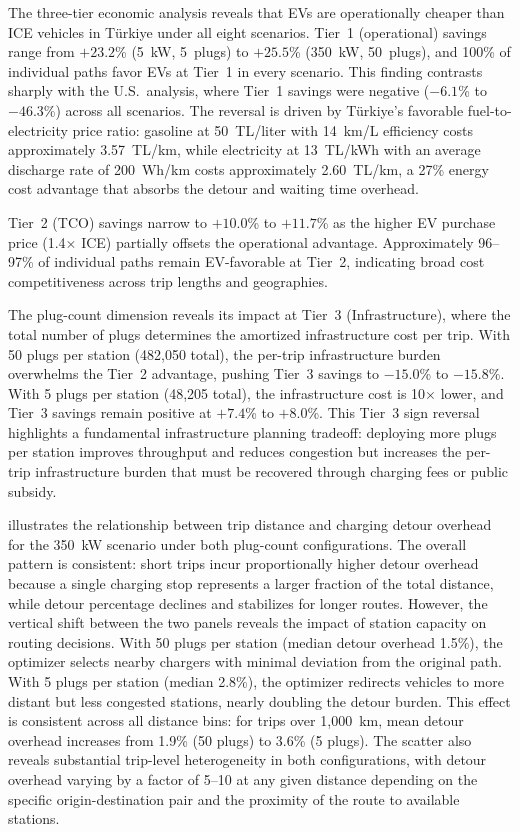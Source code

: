 The three-tier economic analysis reveals that EVs are operationally cheaper than ICE vehicles in T\"{u}rkiye under all eight scenarios. Tier~1 (operational) savings range from $+23.2$\% (5~kW, 5~plugs) to $+25.5$\% (350~kW, 50~plugs), and 100\% of individual paths favor EVs at Tier~1 in every scenario. This finding contrasts sharply with the U.S.\ analysis, where Tier~1 savings were negative ($-6.1$\% to $-46.3$\%) across all scenarios. The reversal is driven by T\"{u}rkiye's favorable fuel-to-electricity price ratio: gasoline at 50~TL/liter with 14~km/L efficiency costs approximately 3.57~TL/km, while electricity at 13~TL/kWh with an average discharge rate of 200~Wh/km costs approximately 2.60~TL/km, a 27\% energy cost advantage that absorbs the detour and waiting time overhead.

Tier~2 (TCO) savings narrow to $+10.0$\% to $+11.7$\% as the higher EV purchase price (1.4$\times$ ICE) partially offsets the operational advantage. Approximately 96--97\% of individual paths remain EV-favorable at Tier~2, indicating broad cost competitiveness across trip lengths and geographies.

The plug-count dimension reveals its impact at Tier~3 (Infrastructure), where the total number of plugs determines the amortized infrastructure cost per trip. With 50 plugs per station (482,050 total), the per-trip infrastructure burden overwhelms the Tier~2 advantage, pushing Tier~3 savings to $-15.0$\% to $-15.8$\%. With 5 plugs per station (48,205 total), the infrastructure cost is 10$\times$ lower, and Tier~3 savings remain positive at $+7.4$\% to $+8.0$\%. This Tier~3 sign reversal highlights a fundamental infrastructure planning tradeoff: deploying more plugs per station improves throughput and reduces congestion but increases the per-trip infrastructure burden that must be recovered through charging fees or public subsidy.

 illustrates the relationship between trip distance and charging detour overhead for the 350~kW scenario under both plug-count configurations. The overall pattern is consistent: short trips incur proportionally higher detour overhead because a single charging stop represents a larger fraction of the total distance, while detour percentage declines and stabilizes for longer routes. However, the vertical shift between the two panels reveals the impact of station capacity on routing decisions. With 50 plugs per station (median detour overhead 1.5\%), the optimizer selects nearby chargers with minimal deviation from the original path. With 5 plugs per station (median 2.8\%), the optimizer redirects vehicles to more distant but less congested stations, nearly doubling the detour burden. This effect is consistent across all distance bins: for trips over 1,000~km, mean detour overhead increases from 1.9\% (50 plugs) to 3.6\% (5 plugs). The scatter also reveals substantial trip-level heterogeneity in both configurations, with detour overhead varying by a factor of 5--10 at any given distance depending on the specific origin-destination pair and the proximity of the route to available stations.

